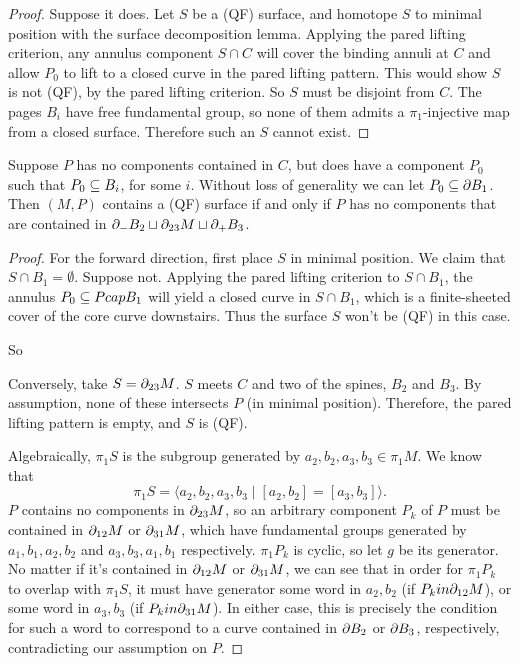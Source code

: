 \begin{proof}

Suppose it does. Let $S$ be a (QF) surface, and homotope $S$ to minimal
position with the surface decomposition lemma. Applying the pared lifting
criterion, any annulus component $S \cap C$ will cover the binding annuli at
$C$ and allow $P_0$ to lift to a closed curve in the pared lifting pattern.
This would show $S$ is not (QF), by the pared lifting criterion. So $S$ must be
disjoint from $C$.  The pages $B_i$ have free fundamental group, so none of
them admits a $\pi_1$-injective map from a closed surface.  Therefore such an
$S$ cannot exist.

\end{proof}

\begin{prop}

Suppose $P$ has no components contained in $C$, but does have a component $P_0$
such that $P_0 \subseteq B_i$, for some $i$.  Without loss of generality we can let
$P_0 \subseteq \partial B_1$.  Then $(M,P)$ contains a (QF) surface if and only if $P$
has no components that are contained in $\partial_-B_2 \sqcup \partial_{23}M \sqcup
\partial_+B_3$.

\end{prop}

\begin{proof}

For the forward direction, first place $S$ in minimal position. We claim that
$S\cap B_1=\emptyset$. Suppose not. Applying the pared lifting criterion to
$S\cap B_1$, the annulus $P_0\subseteq P cap B_1$ will yield a closed curve in
$S\cap B_1$, which is a finite-sheeted cover of the core curve downstairs. Thus
the surface $S$ won't be (QF) in this case.

So %


Conversely, take $S=\partial_{23}M$.  $S$ meets $C$ and two of the spines, $B_2$ and
$B_3$.  By assumption, none of these intersects $P$ (in minimal position).
Therefore, the pared lifting pattern is empty, and $S$ is (QF).

Algebraically, $\pi_1S$ is the subgroup generated by $a_2,b_2,a_3,b_3 \in
\pi_1M$. We know that
\[
\pi_1S = \langle a_2,b_2,a_3,b_3 \mid [a_2,b_2]=[a_3,b_3]\rangle.
\]
$P$ contains no components in $\partial_{23}M$, so an arbitrary component $P_k$ of
$P$ must be contained in $\partial_{12}M$ or $\partial_{31}M$, which have fundamental
groups generated by $a_1,b_1,a_2,b_2$ and $a_3,b_3,a_1,b_1$ respectively.
$\pi_1P_k$ is cyclic, so let $g$ be its generator. No matter if it's contained
in $\partial_{12}M$ or $\partial_{31}M$, we can see that in order for $\pi_1P_k$ to
overlap with $\pi_1S$, it must have generator some word in $a_2,b_2$ (if $P_k
in \partial_{12}M$), or some word in $a_3,b_3$ (if $P_k in \partial_{31}M$). In either
case, this is precisely the condition for such a word to correspond to a curve
contained in $\partial B_2$ or $\partial B_3$, respectively, contradicting our assumption
on $P$.

\end{proof}

